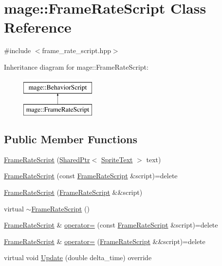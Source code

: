 \hypertarget{classmage_1_1_frame_rate_script}{}\section{mage\+:\+:Frame\+Rate\+Script Class Reference}
\label{classmage_1_1_frame_rate_script}


{\ttfamily \#include $<$frame\+\_\+rate\+\_\+script.\+hpp$>$}

Inheritance diagram for mage\+:\+:Frame\+Rate\+Script\+:\begin{figure}[H]
\begin{center}
\leavevmode
\includegraphics[height=2.000000cm]{classmage_1_1_frame_rate_script}
\end{center}
\end{figure}
\subsection*{Public Member Functions}
\begin{DoxyCompactItemize}
\item 
\hyperlink{classmage_1_1_frame_rate_script_a8ef13ffd08a684cbc2010b0e4594d4cf}{Frame\+Rate\+Script} (\hyperlink{namespacemage_a1e01ae66713838a7a67d30e44c67703e}{Shared\+Ptr}$<$ \hyperlink{classmage_1_1_sprite_text}{Sprite\+Text} $>$ text)
\item 
\hyperlink{classmage_1_1_frame_rate_script_a2c76a1ce175c5c5370582d7ccb878132}{Frame\+Rate\+Script} (const \hyperlink{classmage_1_1_frame_rate_script}{Frame\+Rate\+Script} \&script)=delete
\item 
\hyperlink{classmage_1_1_frame_rate_script_af2cb69b7338169598b80938e9ad77cdd}{Frame\+Rate\+Script} (\hyperlink{classmage_1_1_frame_rate_script}{Frame\+Rate\+Script} \&\&script)
\item 
virtual \hyperlink{classmage_1_1_frame_rate_script_a0863d9339500e10d988dd574448c28f3}{$\sim$\+Frame\+Rate\+Script} ()
\item 
\hyperlink{classmage_1_1_frame_rate_script}{Frame\+Rate\+Script} \& \hyperlink{classmage_1_1_frame_rate_script_a2077ec2facadcde117a20d18e2f0e9b7}{operator=} (const \hyperlink{classmage_1_1_frame_rate_script}{Frame\+Rate\+Script} \&script)=delete
\item 
\hyperlink{classmage_1_1_frame_rate_script}{Frame\+Rate\+Script} \& \hyperlink{classmage_1_1_frame_rate_script_a828664f89350ac0da2da3da26c05a6f0}{operator=} (\hyperlink{classmage_1_1_frame_rate_script}{Frame\+Rate\+Script} \&\&script)=delete
\item 
virtual void \hyperlink{classmage_1_1_frame_rate_script_a9bab0b26279823f1387428268b30e034}{Update} (double delta\+\_\+time) override
\end{DoxyCompactItemize}
